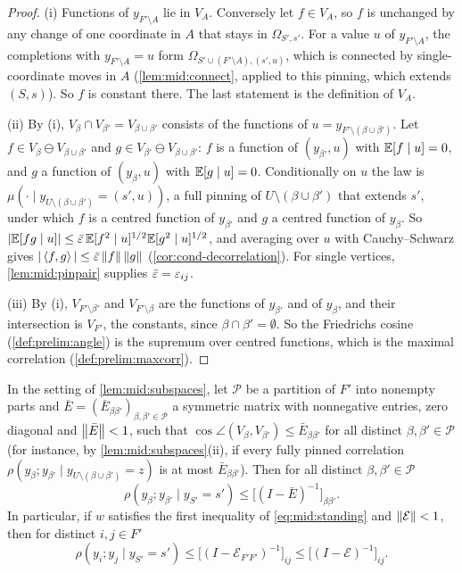 \begin{proof}
(i) Functions of $y_{F'\setminus A}$ lie in $V_A$. Conversely let $f\in V_A$, so
$f$ is unchanged by any change of one coordinate in $A$ that stays in
$\Omega_{S',s'}$. For a value $u$ of $y_{F'\setminus A}$, the completions with
$y_{F'\setminus A}=u$ form $\Omega_{S'\cup(F'\setminus A),(s',u)}$, which is
connected by single-coordinate moves in $A$ (\cref{lem:mid:connect}, applied to
this pinning, which extends $(S,s)$). So $f$ is constant there. The last
statement is the definition of $V_A$.

(ii) By (i), $V_\beta\cap V_{\beta'}=V_{\beta\cup\beta'}$ consists of the
functions of $u=y_{F'\setminus(\beta\cup\beta')}$. Let $f\in V_\beta\ominus
V_{\beta\cup\beta'}$ and $g\in V_{\beta'}\ominus V_{\beta\cup\beta'}$: $f$ is a
function of $(y_{\beta'},u)$ with $\mathbb E[f\mid u]=0$, and $g$ a function of
$(y_\beta,u)$ with $\mathbb E[g\mid u]=0$. Conditionally on $u$ the law is
$\mu(\cdot\mid y_{U\setminus(\beta\cup\beta')}=(s',u))$, a full pinning of
$U\setminus(\beta\cup\beta')$ that extends $s'$, under which $f$ is a centred
function of $y_{\beta'}$ and $g$ a centred function of $y_\beta$. So
$|\mathbb E[fg\mid u]|\le\bar{\varepsilon}\,\mathbb E[f^2\mid u]^{1/2}\mathbb E[g^2\mid u]^{1/2}$, and
averaging over $u$ with Cauchy--Schwarz gives $|\left\langle f,g\right\rangle|\le\bar{\varepsilon}\left\|f\right\|\left\|g\right\|$
(\cref{cor:cond-decorrelation}). For single vertices,
\cref{lem:mid:pinpair} supplies $\bar{\varepsilon}=\varepsilon_{ij}$.

(iii) By (i), $V_{F'\setminus\beta'}$ and $V_{F'\setminus\beta}$ are the
functions of $y_{\beta'}$ and of $y_\beta$, and their intersection is $V_{F'}$,
the constants, since $\beta\cap\beta'=\emptyset$. So the Friedrichs cosine
(\cref{def:prelim:angle}) is the supremum over centred functions, which is the
maximal correlation (\cref{def:prelim:maxcorr}).
\end{proof}

\begin{lemma}\label{lem:mid:allpin}
In the setting of \cref{lem:mid:subspaces}, let $\mathcal P$ be a partition of
$F'$ into nonempty parts and $\bar E=(\bar E_{\beta\beta'})_{\beta,\beta'\in\mathcal
P}$ a symmetric matrix with nonnegative entries, zero diagonal and $\left\|\bar
E\right\|<1$, such that $\cos\angle(V_\beta,V_{\beta'})\le\bar E_{\beta\beta'}$ for all
distinct $\beta,\beta'\in\mathcal P$ (for instance, by
\cref{lem:mid:subspaces}(ii), if every fully pinned correlation
$\rho(y_\beta;y_{\beta'}\mid y_{U\setminus(\beta\cup\beta')}=z)$ is at most $\bar
E_{\beta\beta'}$). Then for all distinct $\beta,\beta'\in\mathcal P$
\[
  \rho(y_\beta;y_{\beta'}\mid y_{S'}=s')\le\big[(I-\bar E)^{-1}\big]_{\beta\beta'} .
\]
In particular, if $w$ satisfies the first inequality of \eqref{eq:mid:standing}
and $\left\|\mathcal E\right\|<1$, then for distinct $i,j\in F'$
\[
  \rho(y_i;y_j\mid y_{S'}=s')\le\big[(I-\mathcal E_{F'F'})^{-1}\big]_{ij}\le
  \big[(I-\mathcal E)^{-1}\big]_{ij}.
\]
\end{lemma}

